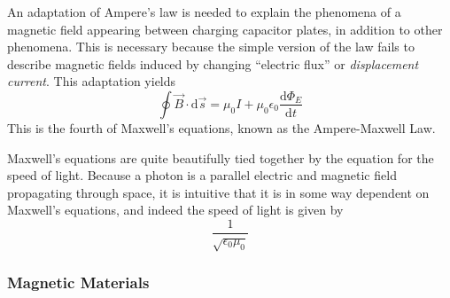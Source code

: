 \documentclass[12pt]{report}
\begin{document}
\begin{flushleft}
\bigskip
An adaptation of Ampere's law is needed to explain the phenomena of a magnetic
field appearing between charging capacitor plates, in addition to other
phenomena. This is necessary because the simple version of the law fails to
describe magnetic fields induced by changing ``electric flux'' or \textit{
displacement current}. This adaptation yields
\[\oint \vec{B}\cdot\mathrm{d}\vec{s} 
= \mu_0I + \mu_0\epsilon_0\frac{\mathrm{d}\Phi_E}{\mathrm{d}t}\]
This is the fourth of Maxwell's equations, known as the Ampere-Maxwell Law.\par
Maxwell's equations are quite beautifully tied together by the equation for the
speed of light. Because a photon is a parallel electric and magnetic field
propagating through space, it is intuitive that it is in some way dependent on
Maxwell's equations, and indeed the speed of light is given by
\[\frac{1}{\sqrt{\epsilon_0\mu_0}}\]

\subsubsection*{Magnetic Materials}


\end{flushleft}
\end{document}
